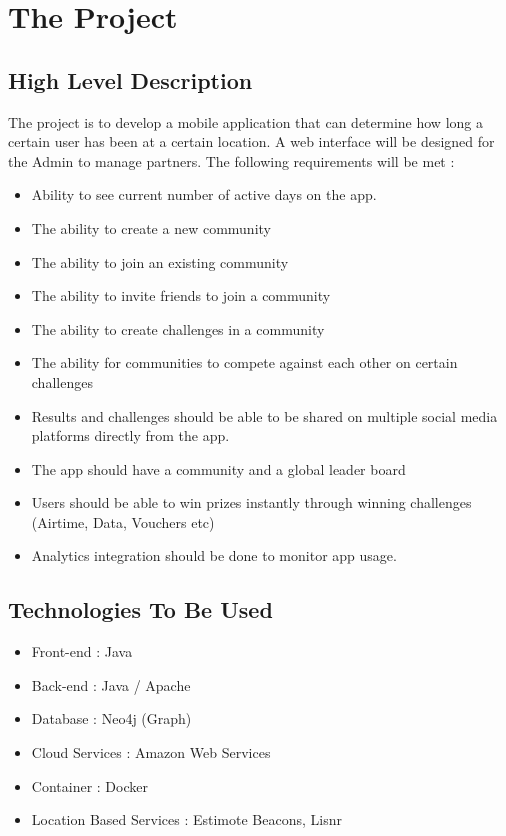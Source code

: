 \documentclass[11pt]{article}
\begin{document}
\section{The Project}
\subsection{High Level Description}
The project is to develop a mobile application that can determine how long a certain user has been at a certain location. A web interface will be designed for the Admin to manage partners.
\newline
\newline The following requirements will be met : 
\begin{itemize}
\item Ability to see current number of active days on the app.
\item The ability to create a new community
\item The ability to join an existing community
\item The ability to invite friends to join a community
\item The ability to create challenges in a community 
\item The ability for communities to compete against each other on certain challenges
\item Results and challenges should be able to be shared on multiple social media platforms directly from the app.
\item The app should have a community and a global leader board
\item Users should be able to win prizes instantly through winning challenges (Airtime, Data, Vouchers etc)
\item Analytics integration should be done to monitor app usage.
\end{itemize}


\subsection{Technologies To Be Used}
\begin{itemize}
\item Front-end : Java 
\item Back-end : Java / Apache
\item Database : Neo4j (Graph)
\item Cloud Services : Amazon Web Services
\item Container : Docker
\item Location Based Services : Estimote Beacons, Lisnr
\end{itemize}
\end{document}
